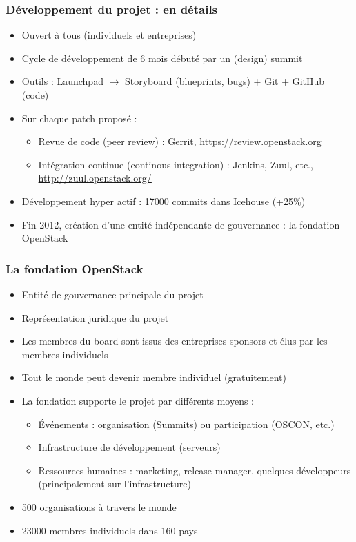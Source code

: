   \begin{frame}
    \frametitle{Développement du projet : en détails}
    \begin{itemize}
      \item Ouvert à tous (individuels et entreprises)\pause
      \item Cycle de développement de 6 mois débuté par un (design) summit\pause
      \item Outils : Launchpad $\rightarrow$ Storyboard (blueprints, bugs) + Git + GitHub (code)\pause
      \item Sur chaque patch proposé :
      \begin{itemize}
        \item Revue de code (peer review) : Gerrit, \url{https://review.openstack.org}
        \item Intégration continue (continous integration) : Jenkins, Zuul, etc., \url{http://zuul.openstack.org/}
      \end{itemize}\pause
      \item Développement hyper actif : 17000 commits dans Icehouse (+25\%)\pause
      \item Fin 2012, création d'une entité indépendante de gouvernance : la fondation OpenStack
    \end{itemize}
  \end{frame}

  \begin{frame}
    \frametitle{La fondation OpenStack}
    \begin{itemize}
      \item Entité de gouvernance principale du projet
      \item Représentation juridique du projet
      \item Les membres du board sont issus des entreprises sponsors et élus par les membres individuels
      \item Tout le monde peut devenir membre individuel (gratuitement)
      \item La fondation supporte le projet par différents moyens :
      \begin{itemize}
        \item Événements : organisation (Summits) ou participation (OSCON, etc.)
        \item Infrastructure de développement (serveurs)
        \item Ressources humaines : marketing, release manager, quelques développeurs (principalement sur l'infrastructure)
      \end{itemize}
      \item 500 organisations à travers le monde
      \item 23000 membres individuels dans 160 pays
    \end{itemize}
  \end{frame}

